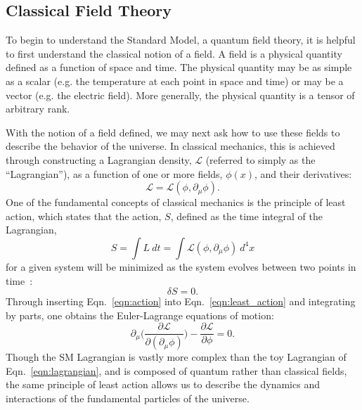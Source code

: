 \subsection{Classical Field Theory}
To begin to understand the Standard Model, a quantum field theory, it is helpful to first understand the classical notion of a field.
A field is a physical quantity defined as a function of space and time.
The physical quantity may be as simple as a scalar (e.g. the temperature at each point in space and time) or may be a vector (e.g. the electric field).
More generally, the physical quantity is a tensor of arbitrary rank.

With the notion of a field defined, we may next ask how to use these fields to describe the behavior of the universe.
In classical mechanics, this is achieved through constructing a Lagrangian density, $\mathcal L$ (referred to simply as the ``Lagrangian''), as a function of one or more fields, $\phi(x)$, and their derivatives:
\begin{equation} \label{eqn:lagrangian}
    \mathcal L = \mathcal L(\phi, \partial_\mu \phi).
\end{equation}
One of the fundamental concepts of classical mechanics is the principle of least action, which states that the action, $S$, defined as the time integral of the Lagrangian,
\begin{equation} \label{eqn:action}
    S = \int L~dt = \int \mathcal L(\phi, \partial_\mu \phi)~d^4x 
\end{equation}
for a given system will be minimized as the system evolves between two points in time~\cite{Peskin:1995ev}:
\begin{equation} \label{eqn:least_action}
    \delta S = 0.
\end{equation}
Through inserting Eqn.~\ref{eqn:action} into Eqn.~\ref{eqn:least_action} and integrating by parts, one obtains the Euler-Lagrange equations of motion:
\begin{equation}
    \partial_\mu \bigg( \frac{\partial \mathcal L}{\partial (\partial_\mu \phi)} \bigg) - \frac{\partial \mathcal L}{\partial \phi} = 0.
\end{equation}
Though the SM Lagrangian is vastly more complex than the toy Lagrangian of Eqn.~\ref{eqn:lagrangian}, and is composed of quantum rather than classical fields, the same principle of least action allows us to describe the dynamics and interactions of the fundamental particles of the universe.


